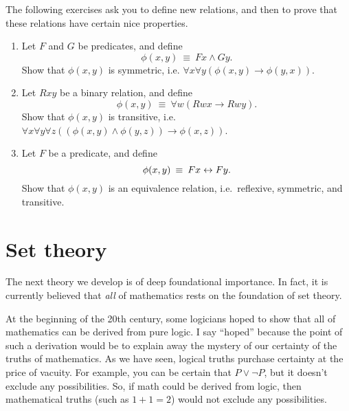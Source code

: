 \begin{exercises} The following exercises ask you to define new
  relations, and then to prove that these relations have certain nice
  properties. \begin{enumerate}
\item Let $F$ and $G$ be predicates, and define
  \[ \phi (x,y) \: \equiv \: Fx\wedge Gy .\] Show that
  $\phi (x,y)$ is symmetric, i.e.
  $\forall x\forall y(\phi (x,y)\to \phi (y,x))$.
\item Let $Rxy$ be a binary relation, and define
  \[ \phi (x,y)\:\equiv\: \forall w(Rwx\to Rwy) .\] Show that
  $\phi (x,y)$ is transitive, i.e.
  $\forall x\forall y\forall z((\phi (x,y)\wedge \phi (y,z))\to \phi
  (x,z))$.
\item Let $F$ be a predicate, and define
  \[ \phi (x,y)\:\equiv \: Fx\leftrightarrow Fy .\] Show that $\phi (x,y)$ is
  an equivalence relation, i.e.\ reflexive, symmetric, and transitive.
\end{enumerate}
\end{exercises}



\section{Set theory}

The next theory we develop is of deep foundational importance.  In
fact, it is currently believed that {\it all} of mathematics rests on
the foundation of set theory.

At the beginning of the 20th century, some logicians hoped to show
that all of mathematics can be derived from pure logic.  I say
``hoped'' because the point of such a derivation would be to explain
away the mystery of our certainty of the truths of mathematics.  As we
have seen, logical truths purchase certainty at the price of vacuity.
For example, you can be certain that $P\vee \neg P$, but it doesn't
exclude any possibilities.  So, if math could be derived from logic,
then mathematical truths (such as $1+1=2$) would not exclude any
possibilities.  

